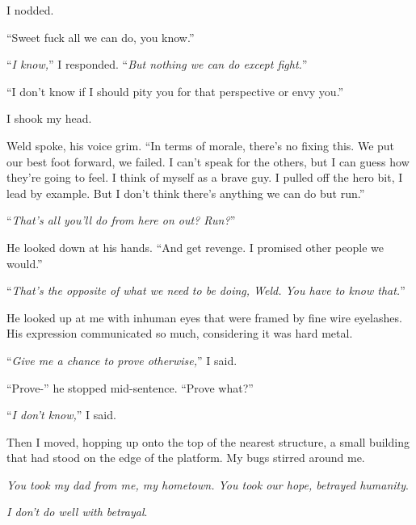 I nodded.



``Sweet fuck all we can do, you know.''



``\emph{I know,}'' I responded.  ``\emph{But nothing we can do except fight.}''



``I don't know if I should pity you for that perspective or envy you.''



I shook my head.



Weld spoke, his voice grim.  ``In terms of morale, there's no fixing this.  We put our best foot forward, we failed.  I can't speak for the others, but I can guess how they're going to feel.  I think of myself as a brave guy.  I pulled off the hero bit, I lead by example.  But I don't think there's anything we can do but run.''



``\emph{That's all you'll do from here on out?  Run?}''



He looked down at his hands.  ``And get revenge.  I promised other people we would.''



``\emph{That's the opposite of what we need to be doing, Weld.  You have to know that.}''



He looked up at me with inhuman eyes that were framed by fine wire eyelashes.  His expression communicated so much, considering it was hard metal.



``\emph{Give me a chance to prove otherwise,}'' I said.



``Prove-'' he stopped mid-sentence.  ``Prove what?''



``\emph{I don't know,}'' I said.



Then I moved, hopping up onto the top of the nearest structure, a small building that had stood on the edge of the platform.  My bugs stirred around me.



\emph{You took my dad from me, my hometown.  You took our hope, betrayed humanity}.



\emph{I don't do well with betrayal}.



